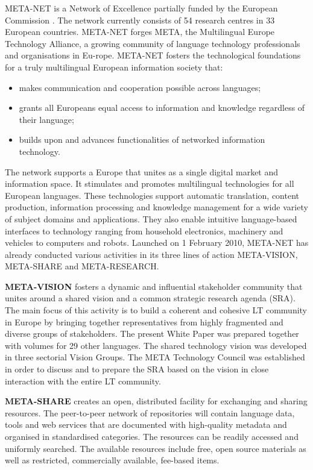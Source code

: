 \begin{multicols}{2}

META-NET is a Network of Excellence partially funded by the European Commission \cite{rehm2011}. The network currently consists of 54 research centres in 33 European countries. META-NET forges META, the Multilingual Europe Technology Alliance, a growing community of language technology professionals and organisations in Eu-rope. META-NET fosters the technological foundations for a truly multilingual European information society that:

\begin{itemize}
\item makes communication and cooperation possible across languages;
\item grants all Europeans equal access to information and knowledge regardless of their language;
\item builds upon and advances functionalities of networked information technology.
\end{itemize}

The network supports a Europe that unites as a single digital market and information space. It stimulates and promotes multilingual technologies for all European languages. These technologies support automatic translation, content production, information processing and knowledge management for a wide variety of subject domains and applications. They also enable intuitive language-based interfaces to technology ranging from household electronics, machinery and vehicles to computers and robots.
Launched on 1 February 2010, META-NET has already conducted various activities in its three lines of action META-VISION, META-SHARE and META-RESEARCH.

\textbf{META-VISION} fosters a dynamic and influential stakeholder community that unites around a shared vision and a common strategic research agenda (SRA). The main focus of this activity is to build a coherent and cohesive LT community in Europe by bringing together representatives from highly fragmented and diverse groups of stakeholders. The present White Paper was prepared together with volumes for 29 other languages. The shared technology vision was developed in three sectorial Vision Groups. The META Technology Council was established in order to discuss and to prepare the SRA based on the vision in close interaction with the entire LT community.

\textbf{META-SHARE} creates an open, distributed facility for exchanging and sharing resources. The peer-to-peer network of repositories will contain language data, tools and web services that are documented with high-quality metadata and organised in standardised categories. The resources can be readily accessed and uniformly searched. The available resources include free, open source materials as well as restricted, commercially available, fee-based items.


\end{multicols}
